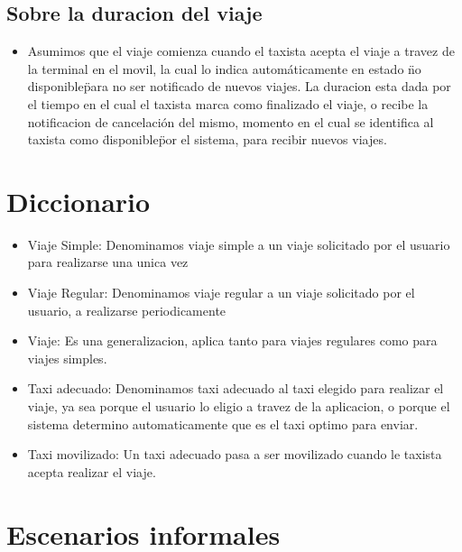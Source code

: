 \documentclass[a4paper]{artcle}
\begin{document}
\subsection{Sobre la duracion del viaje}
\begin{itemize}
\item Asumimos que el viaje comienza cuando el taxista acepta el viaje a travez de la terminal en el movil, la cual lo indica autom\'aticamente en estado \"no disponible\" para no ser notificado de nuevos viajes. La duracion esta dada por el tiempo en el cual el taxista marca como finalizado el viaje, o recibe la notificacion de cancelaci\'on del mismo, momento en el cual se identifica al taxista como \"disponible\" por el sistema, para recibir nuevos viajes.
\end{itemize}

\section{Diccionario}
\begin{itemize}
\item Viaje Simple: Denominamos viaje simple a un viaje solicitado por el usuario para realizarse una unica vez
\item Viaje Regular: Denominamos viaje regular a un viaje solicitado por el usuario, a realizarse periodicamente
\item Viaje: Es una generalizacion, aplica tanto para viajes regulares como para viajes simples.
\item Taxi adecuado: Denominamos taxi adecuado al taxi elegido para realizar el viaje, ya sea porque el usuario lo eligio a travez de la aplicacion, o porque el sistema determino automaticamente que es el taxi optimo para enviar.
\item Taxi movilizado: Un taxi adecuado pasa a ser movilizado cuando le taxista acepta realizar el viaje.
\end{itemize}

\section{Escenarios informales}
\end{document}
